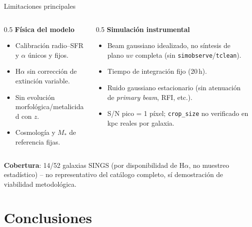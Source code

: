\documentclass[12pt,aspectratio=169]{beamer}
\begin{document}
\begin{frame}{Limitaciones principales}
    \small
    \begin{columns}[T]
        \begin{column}{0.5\textwidth}
            \textbf{Física del modelo}
            \begin{itemize}
                \item Calibración radio--SFR y $\alpha$ únicos y fijos.
                \item H$\alpha$ sin corrección de extinción variable.
                \item Sin evolución morfológica/metalicidad con $z$.
                \item Cosmología y $M_*$ de referencia fijas.
            \end{itemize}
        \end{column}
        \begin{column}{0.5\textwidth}
            \textbf{Simulación instrumental}
            \begin{itemize}
                \item Beam gaussiano idealizado, no síntesis de plano $uv$
                completa (sin \texttt{simobserve}/\texttt{tclean}).
                \item Tiempo de integración fijo (20\,h).
                \item Ruido gaussiano estacionario (sin atenuación de
                \emph{primary beam}, RFI, etc.).
                \item S/N pico = 1 píxel; \texttt{crop\_size} no verificado
                en kpc reales por galaxia.
            \end{itemize}
        \end{column}
    \end{columns}
    \vfill
    \textbf{Cobertura}: 14/52 galaxias SINGS (por disponibilidad de
    H$\alpha$, no muestreo estadístico) -- no representativo del catálogo
    completo, sí demostración de viabilidad metodológica.
\end{frame}

\section{Conclusiones}
\end{document}
